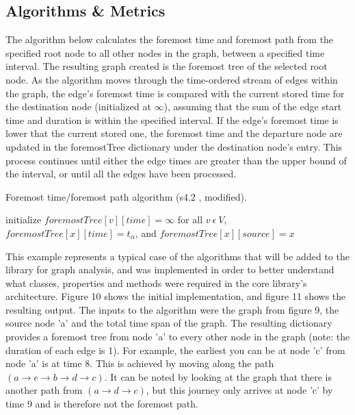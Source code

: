 \begin{design}
\subsection{Algorithms \& Metrics}
The algorithm below calculates the foremost time and foremost path from the specified root node to all other nodes in the graph, between a specified time interval. The resulting graph created is the foremost tree of the selected root node. As the algorithm moves through the time-ordered stream of edges within the graph, the edge's foremost time is compared with the current stored time for the destination node (initialized at $\infty$), assuming that the sum of the edge start time and duration is within the specified interval. If the edge's foremost time is lower that the current stored one, the foremost time and the departure node are updated in the foremostTree dictionary under the destination node's entry. This process continues until either the edge times are greater than the upper bound of the interval, or until all the edges have been processed.\\
\vspace{0.1cm}
\begin{algorithm}[H]
\SetAlgoLined
\caption{Foremost time/foremost path algorithm (s4.2 \cite{efficient_algorithms}, modified).}
 initialize $foremostTree[v][time]=\infty$ for all $v\ \epsilon\ V$, \\
 \hspace{1.5cm}$foremostTree[x][time]=t_\alpha$, and $foremostTree[x][source]=x$\;
 \;
\end{algorithm}
\vspace{0.1cm}
This example represents a typical case of the algorithms that will be added to the library for graph analysis, and was implemented in order to better understand what classes, properties and methods were required in the core library's architecture. Figure 10 shows the initial implementation, and figure 11 shows the resulting output. The inputs to the algorithm were the graph from figure 9, the source node 'a' and the total time span of the graph. The resulting dictionary provides a foremost tree from node 'a' to every other node in the graph (note: the duration of each edge is 1). For example, the earliest you can be at node 'c' from node 'a' is at time 8. This is achieved by moving along the path $(a \to e \to b \to d \to c )$. It can be noted by looking at the graph that there is another path from $(a \to d \to c)$, but this journey only arrives at node 'c' by time 9 and is therefore not the foremost path.

\end{design}
